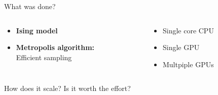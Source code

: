 \documentclass{beamer}
\begin{document}
\begin{frame}{What was done?}
\begin{columns}
    \begin{column}{0.5\paperwidth}
        \begin{itemize}
            \item \textbf{Ising model}
            \item \textbf{Metropolis algorithm:}\\
                Efficient sampling
        \end{itemize}
    \end{column} \pause
    \hfill
    \begin{column}{0.3\paperwidth}
        \begin{itemize}[itemsep=5mm]
            \item[] Single core CPU \pause
            \item[] Single GPU \pause
            \item[] Multpiple GPUs \pause
        \end{itemize}
    \end{column}
\end{columns}
\begin{mybox}
    How does it scale? Is it worth the effort?
\end{mybox}
\end{frame}
\end{document}
